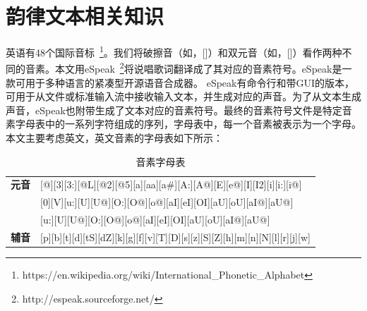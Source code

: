 \begin{table}[h]
  \centering
  \caption{说唱歌词样例及其对应的韵律形式}
  \label{tab:example}%
\end{table}%

\section{韵律文本相关知识}
英语有48个国际音标~\footnote{https://en.wikipedia.org/wiki/International\_Phonetic\_Alphabet}。我们将破擦音（如，[\textteshlig]）和双元音（如，[\textopeno\textsci]）看作两种不同的音素。本文用eSpeak~\footnote{http://espeak.sourceforge.net/}将说唱歌词翻译成了其对应的音素符号。eSpeak是一款可用于多种语言的紧凑型开源语音合成器。 eSpeak有命令行和带GUI的版本，可用于从文件或标准输入流中接收输入文本，并生成对应的声音。为了从文本生成声音，eSpeak也附带生成了文本对应的音素符号。最终的音素符号文件是特定音素字母表中的一系列字符组成的序列，字母表中，每一个音素被表示为一个字母。本文主要考虑英文，英文音素的字母表如下所示：

\begin{table}[h]
\centering
\caption{音素字母表}
\label{table:alphabet}
\renewcommand{\arraystretch}{1.3}
\begin{tabular}{ll}
\toprule
\textbf{元音} & {[}@{]}{[}3{]}{[}3:{]}{[}@L{]}{[}@2{]}{[}@5{]}{[}a{]}{[}aa{]}{[}a\#{]}{[}A:{]}{[}A@{]}{[}E{]}{[}e@{]}{[}I{]}{[}I2{]}{[}i{]}{[}i:{]}{[}i@{]}                                \\
\textbf{}   & {[}0{]}{[}V{]}{[}u:{]}{[}U{]}{[}U@{]}{[}O:{]}{[}O@{]}{[}o@{]}{[}aI{]}{[}eI{]}{[}OI{]}{[}aU{]}{[}oU{]}{[}aI@{]}{[}aU@{]}                                                    \\
\textbf{}   & {[}u:{]}{[}U{]}{[}U@{]}{[}O:{]}{[}O@{]}{[}o@{]}{[}aI{]}{[}eI{]}{[}OI{]}{[}aU{]}{[}oU{]}{[}aI@{]}{[}aU@{]}                                                                  \\ \midrule
\textbf{辅音} & {[}p{]}{[}b{]}{[}t{]}{[}d{]}{[}tS{]}{[}dZ{]}{[}k{]}{[}g{]}{[}f{]}{[}v{]}{[}T{]}{[}D{]}{[}s{]}{[}z{]}{[}S{]}{[}Z{]}{[}h{]}{[}m{]}{[}n{]}{[}N{]}{[}l{]}{[}r{]}{[}j{]}{[}w{]} \\ [2pt]\bottomrule
\end{tabular}
\renewcommand{\arraystretch}{1}
\end{table}

